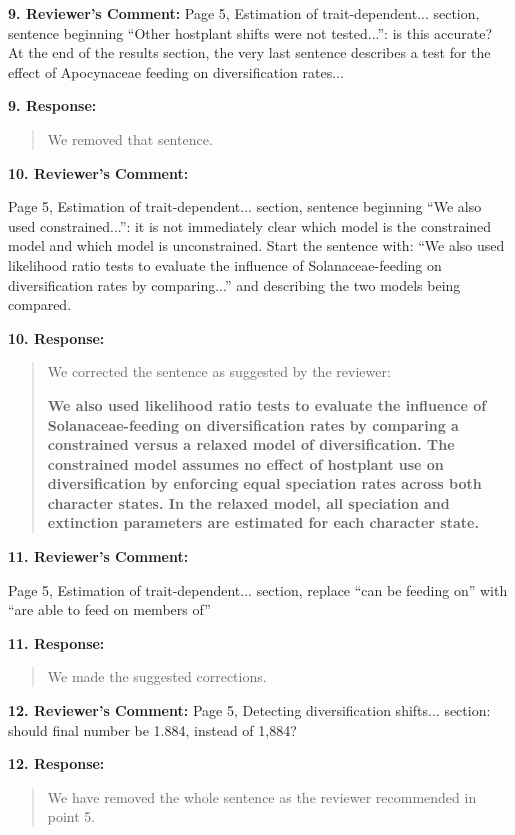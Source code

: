 \documentclass[]{article}
\begin{document}
\textbf{9. Reviewer's Comment:}
Page 5, Estimation of trait-dependent... section, sentence beginning “Other hostplant shifts were not tested...”: is this accurate? At the end of the results section, the very last sentence describes a test for the effect of Apocynaceae feeding on diversification rates...

\textbf{9. Response:}

\begin{quote}
\color{blue}
We removed that sentence.
\end{quote}

\textbf{10. Reviewer's Comment:}

Page 5, Estimation of trait-dependent... section, sentence beginning “We also used constrained...”: it is not immediately clear which model is the constrained model and which model is unconstrained. Start the sentence with: “We also used likelihood ratio tests to evaluate the influence of Solanaceae-feeding on diversification rates by comparing...” and describing the two models being compared.

\textbf{10. Response:}

\begin{quote}
\color{blue}
We corrected the sentence as suggested by the reviewer:

\textbf{We also used likelihood ratio
tests to evaluate the influence of Solanaceae-feeding on diversification rates by comparing a constrained
versus a relaxed model of diversification. The constrained model assumes no effect of hostplant use on
diversification by enforcing equal speciation rates across both character states. In the relaxed model, all
speciation and extinction parameters are estimated for each character state.}
\end{quote}

\textbf{11. Reviewer's Comment:}

Page 5, Estimation of trait-dependent... section, replace “can be feeding on” with “are able to feed on members of”

\textbf{11. Response:}

\begin{quote}
\color{blue}
We made the suggested corrections.
\end{quote}


\textbf{12. Reviewer's Comment:}
 Page 5, Detecting diversification shifts... section: should final number be 1.884, instead of 1,884?

\textbf{12. Response:}

\begin{quote}
\color{blue}
We have removed the whole sentence as the reviewer recommended in point 5.
\end{quote}
\end{document}
